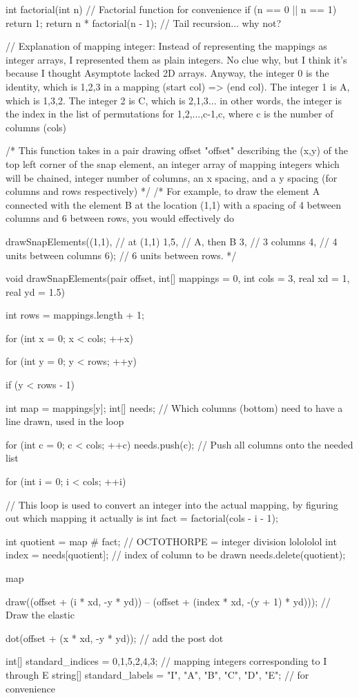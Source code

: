 \documentclass[../gatm.tex]{subfiles}
\begin{document}
\begin{asydef}
	int factorial(int n) { // Factorial function for convenience
		if (n == 0 || n == 1)
			return 1;
		return n * factorial(n - 1); // Tail recursion... why not?
	}

	// Explanation of mapping integer: Instead of representing the mappings as integer arrays, I represented them as plain integers. No clue why, but I think it's because I thought Asymptote lacked 2D arrays. Anyway, the integer 0 is the identity, which is {1,2,3} in a mapping (start col) => (end col). The integer 1 is A, which is {1,3,2}. The integer 2 is C, which is {2,1,3}... in other words, the integer is the index in the list of permutations for {1,2,...,c-1,c}, where c is the number of columns (cols)

	/* This function takes in a pair drawing offset "offset" describing the (x,y) of the top left corner of the snap element, an integer array of mapping integers which will be chained, integer number of columns, an x spacing, and a y spacing (for columns and rows respectively) */
	/* For example, to draw the element A connected with the element B at the location (1,1) with a spacing of 4 between columns and 6 between rows, you would effectively do

	drawSnapElements((1,1), // at (1,1)
					 {1,5}, // A, then B
					 3, // 3 columns
					 4, // 4 units between columns
					 6); // 6 units between rows.
	*/

	void drawSnapElements(pair offset, int[] mappings = {0}, int cols = 3, real xd = 1, real yd = 1.5) {
		int rows = mappings.length + 1;

		for (int x = 0; x < cols; ++x) {
			for (int y = 0; y < rows; ++y) {
				if (y < rows - 1) {
					int map = mappings[y];
					int[] needs; // Which columns (bottom) need to have a line drawn, used in the loop

					for (int c = 0; c < cols; ++c) needs.push(c); // Push all columns onto the needed list

					for (int i = 0; i < cols; ++i) { // This loop is used to convert an integer into the actual mapping, by figuring out which mapping it actually is
						int fact = factorial(cols - i - 1);

						int quotient = map # fact; // OCTOTHORPE = integer division lolololol
						int index = needs[quotient]; // index of column to be drawn
						needs.delete(quotient);

						map %

						draw((offset + (i * xd, -y * yd)) -- (offset + (index * xd, -(y + 1) * yd))); // Draw the elastic
					}
				}
				dot(offset + (x * xd, -y * yd)); // add the post dot
			}
		}
	}

	int[] standard_indices = {0,1,5,2,4,3}; // mapping integers corresponding to I through E
	string[] standard_labels = {"I", "A", "B", "C", "D", "E"}; // for convenience
\end{asydef}
\end{document}
